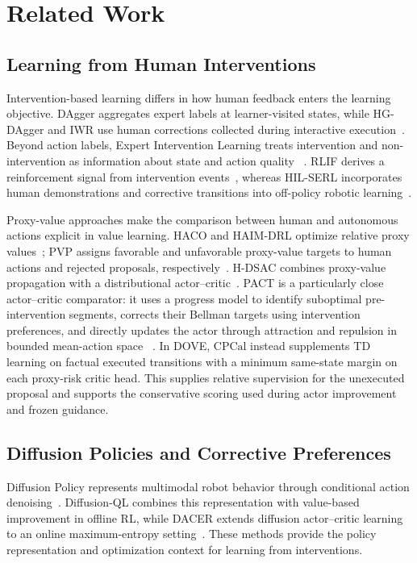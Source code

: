 \documentclass[9pt,journal]{IEEEtran}
\newcommand{\DOVE}{DOVE}
\newcommand{\CPCal}{\ensuremath{\mathrm{CPCal}}}
\begin{document}
\section{Related Work}
\label{sec:related}

\subsection{Learning from Human Interventions}

Intervention-based learning differs in how human feedback enters the
learning objective. DAgger aggregates expert labels at learner-visited
states, while HG-DAgger and IWR use human corrections collected during
interactive execution~\cite{ross2011dagger,kelly2019hgdagger,mandlekar2020iwr}.
Beyond action labels, Expert Intervention Learning treats intervention
and non-intervention as information about state and action quality
~\cite{spencer2020interventions}. RLIF derives a reinforcement signal from
intervention events~\cite{luo2024rlif}, whereas HIL-SERL incorporates
human demonstrations and corrective transitions into off-policy robotic
learning~\cite{luo2025hilserl}.

Proxy-value approaches make the comparison between human and autonomous
actions explicit in value learning. HACO and HAIM-DRL optimize relative
proxy values~\cite{li2022haco,huang2024haim}; PVP assigns favorable and
unfavorable proxy-value targets to human actions and rejected proposals,
respectively~\cite{peng2023pvp}. H-DSAC combines proxy-value propagation
with a distributional actor--critic~\cite{li2025hdsac}.
PACT is a particularly close actor--critic comparator: it uses a progress
model to identify suboptimal pre-intervention segments, corrects their
Bellman targets using intervention preferences, and directly updates the
actor through attraction and repulsion in bounded mean-action space
~\cite{liu2026pact}. In \DOVE{}, \CPCal{} instead supplements TD learning
on factual executed transitions with a minimum same-state margin on each
proxy-risk critic head. This supplies relative supervision for the
unexecuted proposal and supports the conservative scoring used during
actor improvement and frozen guidance.

\subsection{Diffusion Policies and Corrective Preferences}

Diffusion Policy represents multimodal robot behavior through conditional
action denoising~\cite{chi2024diffusionpolicy}. Diffusion-QL combines this
representation with value-based improvement in offline RL, while DACER
extends diffusion actor--critic learning to an online maximum-entropy
setting~\cite{wang2023diffusionql,wang2024dacer}. These methods provide the
policy representation and optimization context for learning from
interventions.
\end{document}
